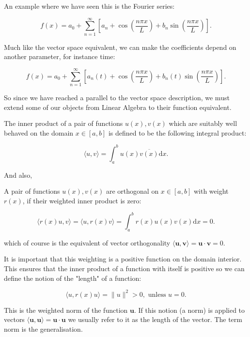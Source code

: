 An example where we have seen this is the Fourier series:

\[
f(x) = a_0 + \sum_{n=1}^{\infty} [ a_n + \cos(\frac{n \pi x}{L}) + b_n \sin(\frac{n \pi x}{L})]
.\] 

Much like the vector space equivalent, we can make the coefficients depend on another parameter, for instance time:

\[
f(x) = a_0 + \sum_{n=1}^{\infty} [ a_n(t) + \cos(\frac{n \pi x}{L}) + b_n(t) \sin(\frac{n \pi x}{L})]
.\] 

So since we have reached a parallel to the vector space description, we must extend some of our objects from Linear Algebra to their function equivalent.

\begin{definition}
The inner product of a pair of functions \(u(x), v(x)\) which are suitably well behaved on the domain \(x \in[a, b]\) is defined to be the following integral product:

\[
\langle u, v\rangle=\int_a^b u(x) \overline{v(x)} \mathrm{d} x .
\]
\end{definition}

And also,

\begin{definition}
A pair of functions \(u(x), v(x)\) are orthogonal on \(x \in[a, b]\) with weight \(r(x)\), if their weighted inner product is zero:

\[
\langle r(x) u, v\rangle=\langle u, r(x) v\rangle=\int_a^b r(x) u(x) v(x) \mathrm{d} x=0 .
\]

which of course is the equivalent of vector orthogonality \(\langle\boldsymbol{u}, \boldsymbol{v}\rangle=\boldsymbol{u} \cdot \boldsymbol{v}=0\).
\end{definition}

\begin{remark}
  It is important that this weighting is a positive function on the domain interior. This ensures that the inner product of a function with itself is positive so we can define the notion of the "length" of a function:

\[
\langle u, r(x) u\rangle=\|u\|^2>0, \text { unless } u=0 .
\]

This is the weighted norm of the function \(\boldsymbol{u}\). If this notion (a norm) is applied to vectors \(\langle\boldsymbol{u}, \boldsymbol{u}\rangle=\boldsymbol{u} \cdot \boldsymbol{u}\) we usually refer to it as the length of the vector. The term norm is the generalisation.
\end{remark}

